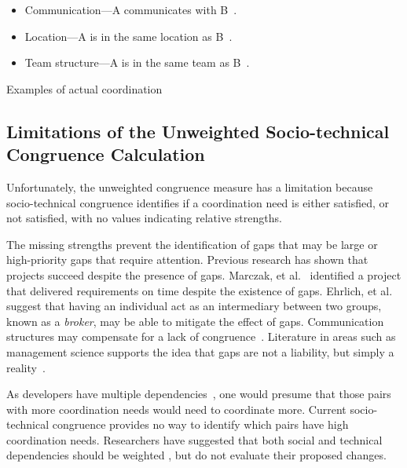 \begin{placeholder}[t]
\begin{itemize}
\item Communication---A communicates with B~\cite{cataldo2006:coordination_reqs, ehrlich2008:gaps, cataldo2008:stc,damian2007:collaboration}.
\item Location---A is in the same location as B~\cite{cataldo2006:coordination_reqs, ehrlich2008:gaps}.
\item Team structure---A is in the same team as B~\cite{cataldo2006:coordination_reqs}.
\end{itemize}
\caption{Examples of actual coordination}
\label{ph:relationships}
\end{placeholder}

\subsection{Limitations of the Unweighted Socio-technical Congruence Calculation}
 
Unfortunately, the unweighted congruence measure has a limitation because socio-technical congruence identifies if a coordination need is either satisfied, or not satisfied, with no values indicating relative strengths.

The missing strengths prevent the identification of gaps that may be large or high-priority gaps that require attention.  Previous research has shown that projects succeed despite the presence of gaps. Marczak, et al.~\cite{marczak2008:brokers} identified a project that delivered requirements on time despite the existence of gaps. 
Ehrlich, et al.~\cite{ehrlich2008:gaps} suggest that having an individual act as an intermediary between two groups, known as a \emph{broker}, may be able to mitigate the effect of gaps.
Communication structures may compensate for a lack of congruence~\cite{hinds2006}. Literature in areas such as management science supports the idea that gaps are not a liability, but simply a reality~\cite{deSouza2004:thwarts_collaboration,hossain}.

As developers have multiple dependencies~\cite{desouza2007:awarenessnetwork,mockus2002:opensource}, one would presume that those pairs with more coordination needs would need to coordinate more. Current socio-technical congruence provides no way to identify which pairs have high coordination needs. Researchers have suggested that both social and technical dependencies should be weighted \cite{valetto2007,kwan2009:weighted}, 
but do not evaluate their proposed changes.

